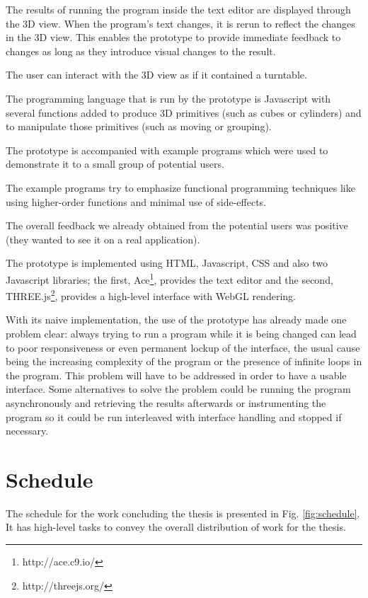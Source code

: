 \documentclass{./llncs2e/llncs}
\begin{document}
	The results of running the program inside the text editor are displayed through the 3D view. 
	When the program's text changes, it is rerun to reflect the changes in the 3D view. 
	This enables the prototype to provide immediate feedback to changes as long as they introduce visual changes to the result.

	The user can interact with the 3D view as if it contained a turntable.

	The programming language that is run by the prototype is Javascript with several functions added to produce 3D primitives (such as cubes or cylinders) and to manipulate those primitives (such as moving or grouping).

	The prototype is accompanied with example programs which were used to demonstrate it to a small group of potential users.

	The example programs try to emphasize functional programming techniques like using higher-order functions and minimal use of side-effects.

	The overall feedback we already obtained from the potential users was positive (they wanted to see it on a real application).

	The prototype is implemented using HTML, Javascript, CSS and also two Javascript libraries; the first, Ace\footnote{http://ace.c9.io/}, provides the text editor and the second, THREE.js\footnote{http://threejs.org/}, provides a high-level interface with WebGL rendering.

	With its naive implementation, the use of the prototype has already made one problem clear: always trying to run a program while it is being changed can lead to poor responsiveness or even permanent lockup of the interface, the usual cause being the increasing complexity of the program or the presence of infinite loops in the program. 
	This problem will have to be addressed in order to have a usable interface. 
	Some alternatives to solve the problem could be running the program asynchronously and retrieving the results afterwards or instrumenting the program so it could be run interleaved with interface handling and stopped if necessary.

\section{Schedule}
	The schedule for the work concluding the thesis is presented in Fig. \ref{fig:schedule}.
	It has high-level tasks to convey the overall distribution of work for the thesis.
	
\end{document}
